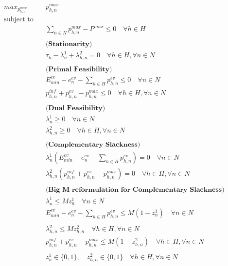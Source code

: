 \begin{align*}
max_{p^{max}_{h,n}} \quad & p^{max}_{h,n} \\
\text{subject to} \quad & \\
& \sum_{n\in N} p^{max}_{h,n} - P^{max} \leq 0 \quad \forall h \in H \\\\
%
& \textbf{(Stationarity)} \\
& \tau_h - \lambda^1_n + \lambda^2_{h,n} = 0 \quad \forall h \in H, \forall n \in N \\\\
%
& \textbf{(Primal Feasibility)} \\
& E^{ev}_{min} - e^{ev}_n - \sum_{h \in H} p^{ev}_{h,n} \leq 0 \quad \forall n \in N \\
& p^{inf}_{h,n} + p^{ev}_{h,n} - p^{max}_{h,n} \leq 0 \quad \forall h \in H, \forall n \in N \\\\
%
& \textbf{(Dual Feasibility)} \\
& \lambda^1_n \geq 0 \quad \forall n \in N \\
& \lambda^2_{h,n} \geq 0 \quad \forall h \in H, \forall n \in N \\\\
%
& \textbf{(Complementary Slackness)} \\
& \lambda^1_n \left( E^{ev}_{min} - e^{ev}_n - \sum_{h \in H} p^{ev}_{h,n} \right) = 0 \quad \forall n \in N \\
& \lambda^2_{h,n} \left( p^{inf}_{h,n} + p^{ev}_{h,n} - p^{max}_{h,n} \right) = 0 \quad \forall h \in H, \forall n \in N\\\\
%
& \textbf{(Big M reformulation for Complementary Slackness)} \\
& \lambda^1_n \leq M z^1_n \quad \forall n \in N \\
& E^{ev}_{min} - e^{ev}_n - \sum_{h \in H} p^{ev}_{h,n} \leq M (1 - z^1_n) \quad \forall n \in N \\\\
& \lambda^2_{h,n} \leq M z^2_{h,n} \quad \forall h \in H, \forall n \in N \\
& p^{inf}_{h,n} + p^{ev}_{h,n} - p^{max}_{h,n} \leq M (1 - z^2_{h,n}) \quad \forall h \in H, \forall n \in N \\\\
& z^1_n \in \{0,1\}, \quad z^2_{h,n} \in \{0,1\} \quad \forall h \in H, \forall n \in N
\end{align*}